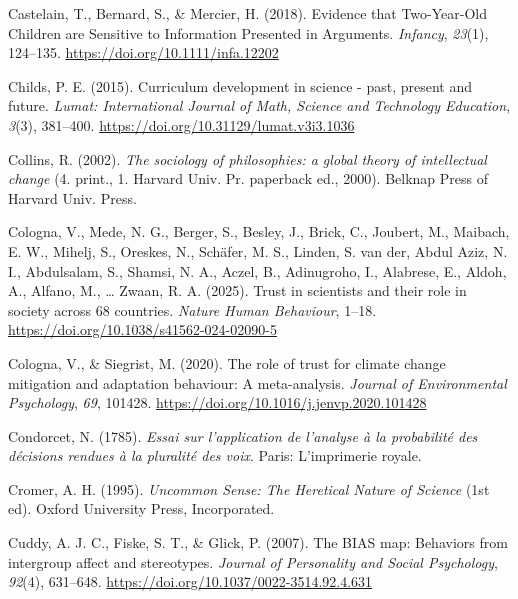 \documentclass[
  jou,
  floatsintext,
  longtable,
  nolmodern,
  notxfonts,
  notimes,
  colorlinks=true,linkcolor=blue,citecolor=blue,urlcolor=blue]{apa7}
\newlength{\cslhangindent}
\newenvironment{CSLReferences}[2] %
 {\begin{list}{}{%
  \setlength{\itemindent}{0pt}
  \setlength{\leftmargin}{0pt}
  \setlength{\parsep}{0pt}
  \ifodd #1
   \setlength{\leftmargin}{\cslhangindent}
   \setlength{\itemindent}{-1\cslhangindent}
  \fi
  \setlength{\itemsep}{#2\baselineskip}}}
 {\end{list}}
\begin{document}
\begin{CSLReferences}{1}{0}
Castelain, T., Bernard, S., \& Mercier, H. (2018). Evidence that
Two{-}Year{-}Old Children are Sensitive to Information Presented in
Arguments. \emph{Infancy}, \emph{23}(1), 124--135.
\url{https://doi.org/10.1111/infa.12202}

Childs, P. E. (2015). Curriculum development in science - past, present
and future. \emph{Lumat: International Journal of Math, Science and
Technology Education}, \emph{3}(3), 381--400.
\url{https://doi.org/10.31129/lumat.v3i3.1036}

Collins, R. (2002). \emph{The sociology of philosophies: a global theory
of intellectual change} (4. print., 1. Harvard Univ. Pr. paperback ed.,
2000). Belknap Press of Harvard Univ. Press.

Cologna, V., Mede, N. G., Berger, S., Besley, J., Brick, C., Joubert,
M., Maibach, E. W., Mihelj, S., Oreskes, N., Schäfer, M. S., Linden, S.
van der, Abdul Aziz, N. I., Abdulsalam, S., Shamsi, N. A., Aczel, B.,
Adinugroho, I., Alabrese, E., Aldoh, A., Alfano, M., \ldots{} Zwaan, R.
A. (2025). Trust in scientists and their role in society across 68
countries. \emph{Nature Human Behaviour}, 1--18.
\url{https://doi.org/10.1038/s41562-024-02090-5}

Cologna, V., \& Siegrist, M. (2020). The role of trust for climate
change mitigation and adaptation behaviour: A meta-analysis.
\emph{Journal of Environmental Psychology}, \emph{69}, 101428.
\url{https://doi.org/10.1016/j.jenvp.2020.101428}

Condorcet, N. (1785). \emph{Essai sur l'application de l'analyse à la
probabilité des décisions rendues à la pluralité des voix}. Paris:
L{'}imprimerie royale.

Cromer, A. H. (1995). \emph{Uncommon Sense: The Heretical Nature of
Science} (1st ed). Oxford University Press, Incorporated.

Cuddy, A. J. C., Fiske, S. T., \& Glick, P. (2007). The BIAS map:
Behaviors from intergroup affect and stereotypes. \emph{Journal of
Personality and Social Psychology}, \emph{92}(4), 631--648.
\url{https://doi.org/10.1037/0022-3514.92.4.631}


\end{CSLReferences}
\end{document}
